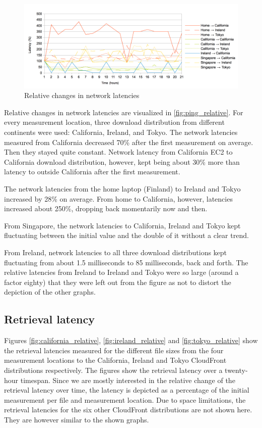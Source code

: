 \documentclass[conference]{IEEEtran}
\begin{document}
\begin{figure}[h]
    \centering
    \includegraphics[width=\linewidth]{images/pings_relative.png}
    \caption[]{Relative changes in network latencies}
    \label{fig:ping_relative}
\end{figure}

Relative changes in network latencies are visualized in \autoref{fig:ping_relative}. For every measurement location, three download distribution from different continents were used: California, Ireland, and Tokyo. The network latencies measured from California decreased 70\% after the first measurement on average. Then they stayed quite constant. Network latency from California EC2 to California download distribution, however, kept being about 30\% more than latency to outside California after the first measurement.

The network latencies from the home laptop (Finland) to Ireland and Tokyo increased by 28\% on average. From home to California, however, latencies increased about 250\%, dropping back momentarily now and then.

From Singapore, the network latencies to California, Ireland and Tokyo kept fluctuating between the initial value and the double of it without a clear trend.

From Ireland, network latencies to all three download distributions kept fluctuating from about 1.5 milliseconds to 85 milliseconds, back and forth. The relative latencies from Ireland to Ireland and Tokyo were so large (around a factor eighty) that they were left out from the figure as not to distort the depiction of the other graphs.

\subsection{Retrieval latency}
Figures \ref{fig:california_relative}, \ref{fig:ireland_relative} and \ref{fig:tokyo_relative} show the retrieval latencies measured for the different file sizes from the four measurement locations to the California, Ireland and Tokyo CloudFront distributions respectively. The figures show the retrieval latency over a twenty-hour timespan. Since we are mostly interested in the relative change of the retrieval latency over time, the latency is depicted as a percentage of the initial measurement per file and measurement location. Due to space limitations, the retrieval latencies for the six other CloudFront distributions are not shown here. They are however similar to the shown graphs. %
\end{document}
